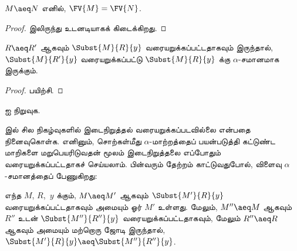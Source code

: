 \documentclass[../../../include/open-logic-section]{subfiles}
\begin{document}
\begin{thm}
  $M \aeq N$ எனில், $\FV{M} = \FV{N}$.
\end{thm}

\begin{proof}
   இலிருந்து உடனடியாகக் கிடைக்கிறது.
\end{proof}

\begin{lem}
  $R \aeq R'$ ஆகவும் $\Subst{M}{R}{y}$ வரையறுக்கப்பட்டதாகவும் இருந்தால்,
  $\Subst{M}{R'}{y}$ வரையறுக்கப்பட்டு $\Subst{M}{R}{y}$ க்கு
  $\alpha$-சமானமாக இருக்கும்.
\end{lem}

\begin{proof}
  பயிற்சி.
\end{proof}

\begin{prob}
   ஐ நிறுவுக.
\end{prob}

 இல் சில நிகழ்வுகளில் இடைநிறுத்தல் வரையறுக்கப்படவில்லை என்பதை
நினைவுகொள்க. எனினும், சொற்கள்மீது $\alpha$-மாற்றத்தைப் பயன்படுத்தி கட்டுண்ட
மாறிகளை மறுபெயரிடுவதன் மூலம் இடைநிறுத்தலை எப்போதும் வரையறுக்கப்பட்டதாகச்
செய்யலாம். பின்வரும் தேற்றம் காட்டுவதுபோல், விளைவு $\alpha$-சமானத்தைப்
பேணுகிறது:

\begin{thm}
  எந்த $M$, $R$,~$y$ க்கும், $M \aeq M'$ ஆகவும் $\Subst{M'}{R}{y}$
  வரையறுக்கப்பட்டதாகவும் அமையும் ஓர் $M'$ உள்ளது. மேலும்,
  $M'' \aeq M$ ஆகவும் $R''$ உடன் $\Subst{M''}{R''}{y}$
  வரையறுக்கப்பட்டதாகவும், மேலும் $R'' \aeq R$ ஆகவும் அமையும் மற்றொரு ஜோடி
  இருந்தால்,
  $\Subst{M'}{R}{y} \aeq \Subst{M''}{R''}{y}$.
\end{thm}
\end{document}
